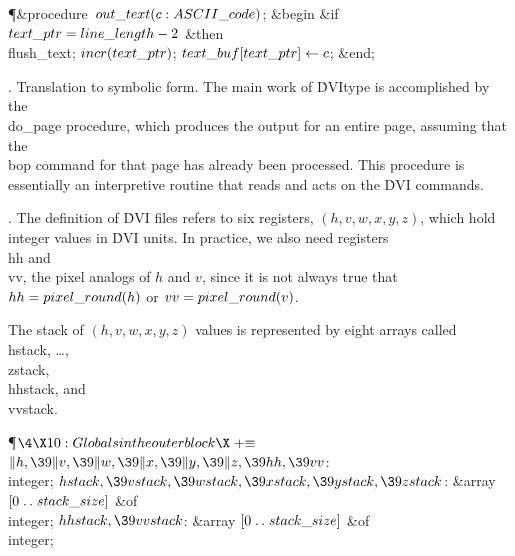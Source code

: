 \Y\P\4\&{procedure}\1\  $\\{out\_text}(\|c:\\{ASCII\_code})$;\2\6
\&{begin} \&{if} $\\{text\_ptr}=\\{line\_length}-2$ \1\&{then}\5
\\{flush\_text};\2\6
$\\{incr}(\\{text\_ptr})$;\5
$\\{text\_buf}[\\{text\_ptr}]\K\|c$;\6
\&{end};\par
\fi

.  Translation to symbolic form.
The main work of \.{DVItype} is accomplished by the \\{do\_page} procedure,
which produces the output for an entire page, assuming that the \\{bop}
command for that page has already been processed. This procedure is
essentially an interpretive routine that reads and acts on the \.{DVI}
commands.

\fi

. The definition of \.{DVI} files refers to six registers,
$(h,v,w,x,y,z)$, which hold integer values in \.{DVI} units.  In practice,
we also need registers \\{hh} and \\{vv}, the pixel analogs of $h$ and $v$,
since it is not always true that $\\{hh}=\\{pixel\_round}(\|h)$ or
$\\{vv}=\\{pixel\_round}(\|v)$.

The stack of $(h,v,w,x,y,z)$ values is represented by eight arrays
called \\{hstack}, \dots, \\{zstack}, \\{hhstack}, and \\{vvstack}.

\Y\P$\4\X10:Globals in the outer block\X\mathrel{+}\S$\6
\4$\|h,\39\|v,\39\|w,\39\|x,\39\|y,\39\|z,\39\\{hh},\39\\{vv}$: \\{integer};%
\6
\4$\\{hstack},\39\\{vstack},\39\\{wstack},\39\\{xstack},\39\\{ystack},\39%
\\{zstack}$: \&{array} $[0\to\\{stack\_size}]$ \1\&{of}\5
\\{integer};\2\6
\4$\\{hhstack},\39\\{vvstack}$: \&{array} $[0\to\\{stack\_size}]$ \1\&{of}\5
\\{integer};\2\par
\fi

